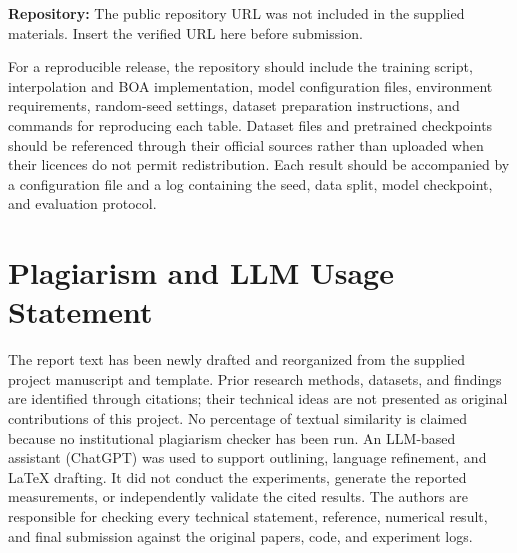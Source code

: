 \documentclass[11pt,a4paper]{article}
\begin{document}
\textbf{Repository:} The public repository URL was not included in the supplied materials. Insert the verified URL here before submission.

For a reproducible release, the repository should include the training script, interpolation and BOA implementation, model configuration files, environment requirements, random-seed settings, dataset preparation instructions, and commands for reproducing each table. Dataset files and pretrained checkpoints should be referenced through their official sources rather than uploaded when their licences do not permit redistribution. Each result should be accompanied by a configuration file and a log containing the seed, data split, model checkpoint, and evaluation protocol.

\section{Plagiarism and LLM Usage Statement}

The report text has been newly drafted and reorganized from the supplied project manuscript and template. Prior research methods, datasets, and findings are identified through citations; their technical ideas are not presented as original contributions of this project. No percentage of textual similarity is claimed because no institutional plagiarism checker has been run. An LLM-based assistant (ChatGPT) was used to support outlining, language refinement, and LaTeX drafting. It did not conduct the experiments, generate the reported measurements, or independently validate the cited results. The authors are responsible for checking every technical statement, reference, numerical result, and final submission against the original papers, code, and experiment logs.
\end{document}
